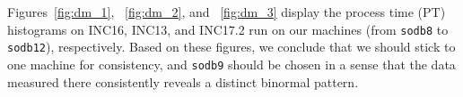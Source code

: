 Figures~\ref{fig:dm_1}, ~\ref{fig:dm_2}, and ~\ref{fig:dm_3} display the process time (PT) histograms on INC16, INC13, and INC17.2 run on our machines (from {\tt sodb8} to {\tt sodb12}), respectively. Based on these figures, we conclude that we should stick to one machine  for consistency, and {\tt sodb9} should be chosen in a sense that the data measured there consistently reveals a distinct binormal pattern.

\begin{figure}[h]
	\centering
\end{figure}
